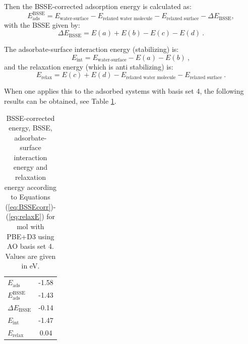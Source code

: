 \documentclass[11pt,DIV=13,BCOR=5mm,a4paper,headinclude]{scrbook}
\begin{document}
Then the BSSE-corrected adsorption energy is calculated as:
\begin{equation}\label{eq:BSSEcorr}
E_\textrm{ads}^\textrm{BSSE}=E_{\textrm{water-surface}}-E_{\textrm{relaxed water molecule}}-E_{\textrm{relaxed surface}}-\Delta E_\textrm{BSSE},
\end{equation}
with the BSSE given by:
\begin{equation}
 \Delta E_\textrm{BSSE}=E(a)+E(b)-E(c)-E(d) ~.
\end{equation}

The adsorbate-surface interaction energy (stabilizing) is:
\begin{equation}
 E_\textrm{int}=E_{\textrm{water-surface}}-E(a)-E(b) ~,
\end{equation}
and the relaxation energy (which is anti stabilizing) is:
\begin{equation}\label{eq:relaxE}
 E_\textrm{relax}=E(c)+E(d)-E_{\textrm{relaxed water molecule}}-E_{\textrm{relaxed surface}} ~.
\end{equation}


When one applies this to the adsorbed systems with basis set 4, the following results can be obtained, see Table \ref{tab:bsse-results}.
\begin{table}[!h]
  \centering
   \caption{BSSE-corrected energy, BSSE, adsorbate-surface interaction energy and relaxation energy according to Equations (\ref{eq:BSSEcorr})-(\ref{eq:relaxE}) for mol with PBE+D3 using AO basis set 4.
Values are given in eV.}
  \begin{tabular}{l|c}
  \toprule
$E_\textrm{ads}$	&-1.58 \\
$E_\textrm{ads}^\textrm{BSSE}$&-1.43\\ %
$\Delta E_\textrm{BSSE}$&-0.14\\%
$E_\textrm{int}$	&-1.47\\ %
$E_\textrm{relax}$	&0.04 \\\bottomrule%
  \end{tabular}
  \label{tab:bsse-results}
 \end{table}
 \\
 
\end{document}

